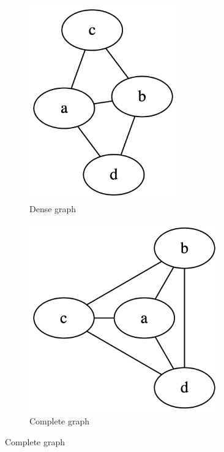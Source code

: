 \documentclass[a3paper, landscape, 11pt]{article} %
\begin{document}
\begin{multicols*}{4}
{\begin{figure}[H]
\begin{subfigure}[b]{0.3\columnwidth}
    \includegraphics[width=0.7\textwidth]{images/dense.png}
    \caption{Dense graph}
    \label{fig:image2}
  \end{subfigure}
	\hfill
  \begin{subfigure}[b]{0.315\columnwidth}
    \centering
    \includegraphics[width=0.9\textwidth]{images/complete.png}
    \caption{Complete graph}
    \label{fig:image3}
  \end{subfigure}
\end{figure}
}


\end{multicols*}
\end{document}
